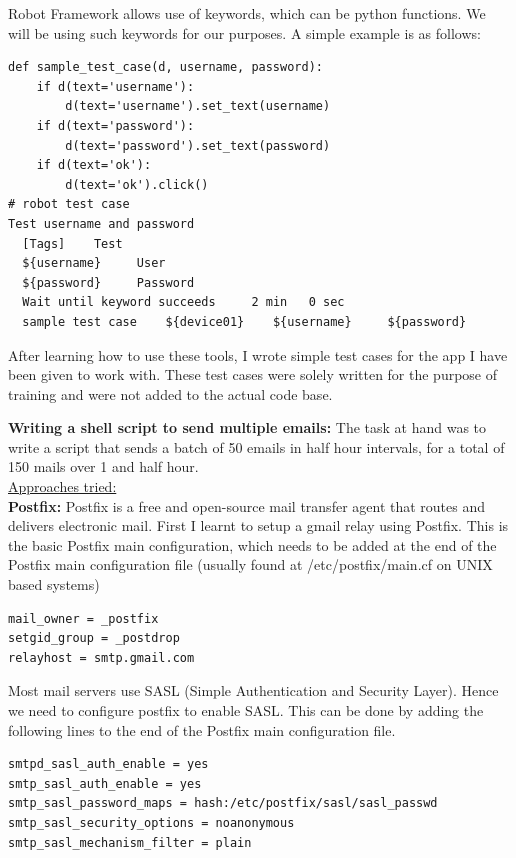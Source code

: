\documentclass[a4paper,12pt]{article}
\begin{document}
Robot Framework allows use of keywords, which can be python functions. We will be using such keywords for our purposes. A simple example is as follows:

\begin{lstlisting}[style=PyStyle]
def sample_test_case(d, username, password):
	if d(text='username'):
		d(text='username').set_text(username)
	if d(text='password'):
		d(text='password').set_text(password)
	if d(text='ok'):
		d(text='ok').click()	
# robot test case
Test username and password
  [Tags]    Test
  ${username}     User
  ${password}     Password
  Wait until keyword succeeds     2 min   0 sec   
  sample test case    ${device01}    ${username}     ${password}
\end{lstlisting}
After learning how to use these tools, I wrote simple test cases for the app I have been given to work with. These test cases were solely written for the purpose of training and were not added to the actual code base. 

\textbf{Writing a shell script to send multiple emails:} 
The task at hand was to write a script that sends a batch of 50 emails in half hour intervals, for a total of 150 mails over 1 and half hour. \\

\underline{Approaches tried:}\\

\textbf{Postfix:} Postfix is a free and open-source mail transfer agent that routes and delivers electronic mail. First I learnt to setup a gmail relay using Postfix. This is the basic Postfix main configuration, which needs to be added at the end of the Postfix main configuration file (usually found at /etc/postfix/main.cf on UNIX based systems)

\begin{lstlisting}[style=ShellStyle]
mail_owner = _postfix
setgid_group = _postdrop
relayhost = smtp.gmail.com
\end{lstlisting} 

Most mail servers use SASL (Simple Authentication and Security Layer). Hence we need to configure postfix to enable SASL. This can be done by adding the following lines to the end of the Postfix main configuration file. 

\begin{lstlisting}[style=ShellStyle]
smtpd_sasl_auth_enable = yes
smtp_sasl_auth_enable = yes
smtp_sasl_password_maps = hash:/etc/postfix/sasl/sasl_passwd
smtp_sasl_security_options = noanonymous
smtp_sasl_mechanism_filter = plain
\end{lstlisting}
\end{document}
